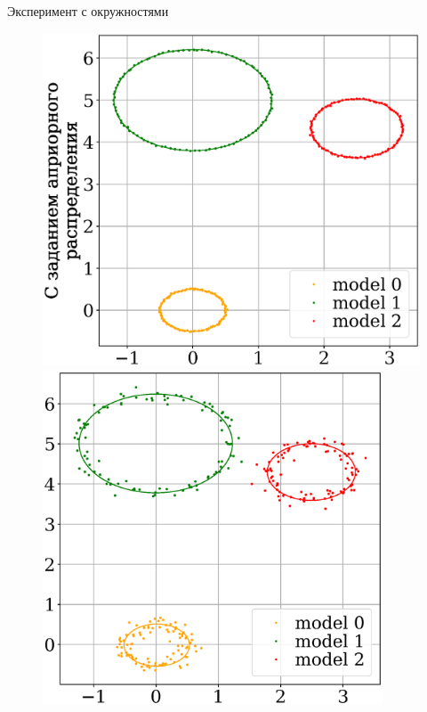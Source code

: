 \documentclass[10pt,pdf,hyperref={unicode}]{beamer}
\begin{document}
\begin{frame}{Эксперимент с окружностями}
\justifying

\begin{figure}[h!]
\begin{minipage}{.25\textwidth}
      \includegraphics[width =  1.0\textwidth]{figures/910.eps}
\end{minipage}
\begin{minipage}{.25\textwidth}
\hspace{0.3mm}
      \includegraphics[width =  0.9\textwidth]{figures/901.eps}

\end{minipage}
\end{figure}
\end{frame}
\end{document}
